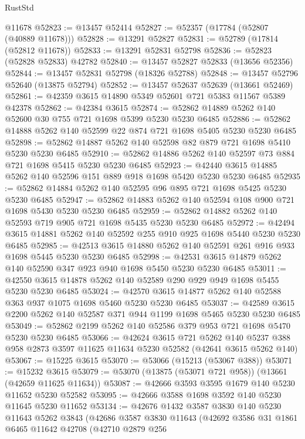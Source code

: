\begin{lexlean}{RustStd}
\begin{coremodule}
    @11678
@52823 := @13457 @52414
@52827 := @52357 (@17784 (@52807 (@40889 @11678)))
@52828 := @13291 @52827
@52831 := @52789 (@17814 (@52812 @11678))
@52833 := @13291 @52831 @52798
@52836 := @52823 (@52828 @52833) @42782
@52840 := @13457 @52827 @52833 (@13656 @52356)
@52844 := @13457 @52831 @52798 (@18326 @52788)
@52848 := @13457 @52796 @52640 (@13875 @52794)
@52852 := @13457 @52637 @52639 (@13661 @52469)
@52861 := @42359 @3615 @14890 @5349 @52601 @721 @5383 @11567 @5389 @42378
@52862 := @42384 @3615
@52874 := @52862 @14889 @5262 @140 @52600 @30 @755 @721 @1698 @5399 @5230 @5230 @6485
@52886 := @52862 @14888 @5262 @140 @52599 @22 @874 @721 @1698 @5405 @5230 @5230 @6485
@52898 := @52862 @14887 @5262 @140 @52598 @82 @879 @721 @1698 @5410 @5230 @5230 @6485
@52910 := @52862 @14886 @5262 @140 @52597 @73 @884 @721 @1698 @5415 @5230 @5230 @6485
@52923 := @42440 @3615 @14885 @5262 @140 @52596 @151 @889 @918 @1698 @5420 @5230 @5230 @6485
@52935 := @52862 @14884 @5262 @140 @52595 @96 @895 @721 @1698 @5425 @5230 @5230 @6485
@52947 := @52862 @14883 @5262 @140 @52594 @108 @900 @721 @1698 @5430 @5230 @5230 @6485
@52959 := @52862 @14882 @5262 @140 @52593 @719 @905 @721 @1698 @5435 @5230 @5230 @6485
@52972 := @42494 @3615 @14881 @5262 @140 @52592 @255 @910 @925 @1698 @5440 @5230 @5230 @6485
@52985 := @42513 @3615 @14880 @5262 @140 @52591 @261 @916 @933 @1698 @5445 @5230 @5230 @6485
@52998 := @42531 @3615 @14879 @5262 @140 @52590 @347 @923 @940 @1698 @5450 @5230 @5230 @6485
@53011 := @42550 @3615 @14878 @5262 @140 @52589 @290 @929 @949 @1698 @5455 @5230 @5230 @6485
@53024 := @42570 @3615 @14877 @5262 @140 @52588 @363 @937 @1075 @1698 @5460 @5230 @5230 @6485
@53037 := @42589 @3615 @2200 @5262 @140 @52587 @371 @944 @1199 @1698 @5465 @5230 @5230 @6485
@53049 := @52862 @2199 @5262 @140 @52586 @379 @953 @721 @1698 @5470 @5230 @5230 @6485
@53066 := @42624
    @3615
    @721
    @5262
    @140
    @5237
    @388
    @958
    @2873
    @3597
    @11625
    @11634
    @5230
    @52582
    (@42641 @3615 @5262 @140)
@53067 := @15225 @3615
@53070 := @53066 (@15213 (@53067 @388))
@53071 := @15232 @3615
@53079 := @53070 (@13875 (@53071 @721 @958)) (@13661 (@42659 @11625 @11634))
@53087 := @42666 @3593 @3595 @1679 @140 @5230 @11652 @5230 @52582
@53095 := @42666 @3588 @1698 @3592 @140 @5230 @11645 @5230 @11652
@53134 := @42676
    @1432
    @3587
    @3830
    @140
    @5230
    @11643
    @5262
    @3843
    (@42686
      @3587
      @3830
      @11643
      (@42692
        @3586
        @31
        @1861
        @6465
        @11642
        @42708
        (@42710
          @2879
          @256

\end{coremodule}
\end{lexlean}
